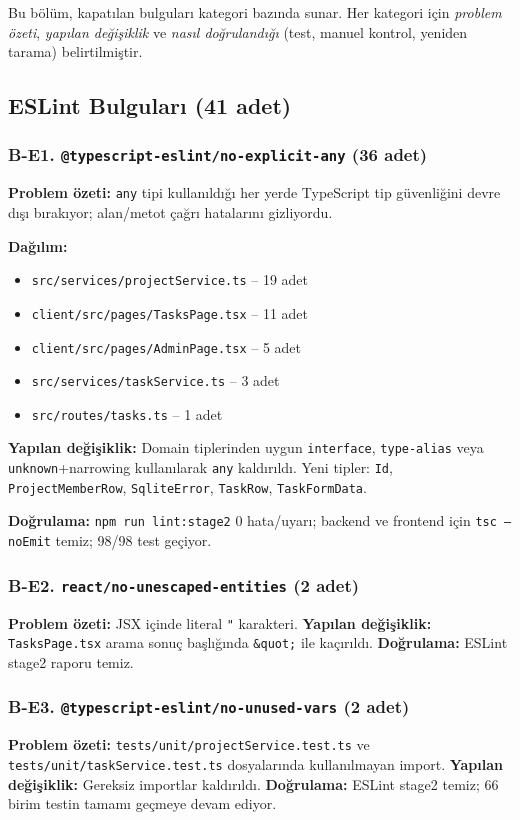 \documentclass[conference]{IEEEtran}
\begin{document}
Bu bölüm, kapatılan bulguları kategori bazında sunar. Her kategori için
\emph{problem özeti}, \emph{yapılan değişiklik} ve \emph{nasıl
doğrulandığı} (test, manuel kontrol, yeniden tarama) belirtilmiştir.

\subsection{ESLint Bulguları (41 adet)}

\subsubsection{B-E1. \texttt{@typescript-eslint/no-explicit-any} (36 adet)}
\textbf{Problem özeti:} \texttt{any} tipi kullanıldığı her yerde TypeScript
tip güvenliğini devre dışı bırakıyor; alan/metot çağrı hatalarını gizliyordu.

\textbf{Dağılım:}
\begin{itemize}
\item \texttt{src/services/projectService.ts} -- 19 adet
\item \texttt{client/src/pages/TasksPage.tsx} -- 11 adet
\item \texttt{client/src/pages/AdminPage.tsx} -- 5 adet
\item \texttt{src/services/taskService.ts} -- 3 adet
\item \texttt{src/routes/tasks.ts} -- 1 adet
\end{itemize}

\textbf{Yapılan değişiklik:} Domain tiplerinden uygun \texttt{interface},
\texttt{type-alias} veya \texttt{unknown}+narrowing kullanılarak
\texttt{any} kaldırıldı. Yeni tipler: \texttt{Id}, \texttt{ProjectMemberRow},
\texttt{SqliteError}, \texttt{TaskRow}, \texttt{TaskFormData}.

\textbf{Doğrulama:} \texttt{npm run lint:stage2} 0 hata/uyarı; backend ve
frontend için \texttt{tsc --noEmit} temiz; 98/98 test geçiyor.

\subsubsection{B-E2. \texttt{react/no-unescaped-entities} (2 adet)}
\textbf{Problem özeti:} JSX içinde literal \texttt{"} karakteri.
\textbf{Yapılan değişiklik:} \texttt{TasksPage.tsx} arama sonuç başlığında
\texttt{\&quot;} ile kaçırıldı.
\textbf{Doğrulama:} ESLint stage2 raporu temiz.

\subsubsection{B-E3. \texttt{@typescript-eslint/no-unused-vars} (2 adet)}
\textbf{Problem özeti:} \texttt{tests/unit/projectService.test.ts} ve
\texttt{tests/unit/taskService.test.ts} dosyalarında kullanılmayan import.
\textbf{Yapılan değişiklik:} Gereksiz importlar kaldırıldı.
\textbf{Doğrulama:} ESLint stage2 temiz; 66 birim testin tamamı geçmeye
devam ediyor.
\end{document}
